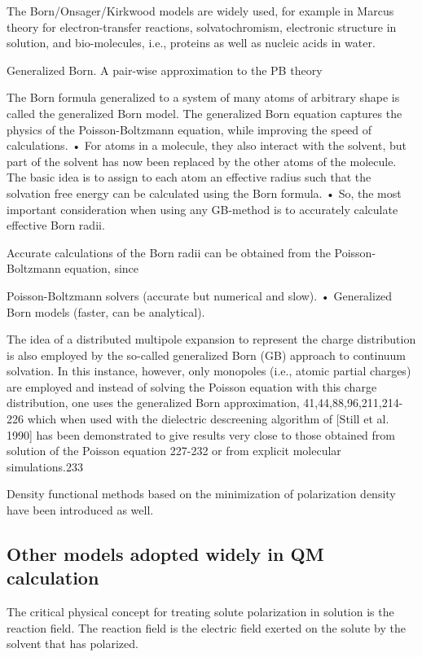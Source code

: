 The Born/Onsager/Kirkwood models are widely used, for example in Marcus
theory for electron-transfer reactions, solvatochromism, electronic
structure in solution, and bio-molecules, i.e., proteins as well as nucleic
acids in water. \citep{hirata_molecular_2004}

Generalized Born. A pair-wise approximation to the PB theory

The Born formula generalized to a system of many atoms of arbitrary
shape is called the generalized Born model. The generalized Born equation
captures the physics of the Poisson-Boltzmann equation, while improving
the speed of calculations. • For atoms in a molecule, they also interact
with the solvent, but part of the solvent has now been replaced by
the other atoms of the molecule. The basic idea is to assign to each
atom an effective radius such that the solvation free energy can
be calculated using the Born formula. • So, the most important consideration
when using any GB-method is to accurately calculate effective Born
radii.

Accurate calculations of the Born radii can be obtained from the
Poisson-Boltzmann equation, since

Poisson-Boltzmann solvers (accurate but numerical and slow). • Generalized
Born models (faster, can be analytical). 

The idea of a distributed multipole expansion to represent the charge
distribution is also employed by the so-called generalized Born (GB)
approach to continuum solvation. In this instance, however, only monopoles
(i.e., atomic partial charges) are employed and instead of solving
the Poisson equation with this charge distribution, one uses the generalized
Born approximation, 41,44,88,96,211,214-226 which when used with
the dielectric descreening algorithm of {[}Still et al. 1990{]} has
been demonstrated to give results very close to those obtained from
solution of the Poisson equation 227-232 or from explicit molecular
simulations.233 

Density functional methods based on the minimization of polarization
density have been introduced as well. \citep{Marchi_2001}


\subsection{Other models adopted widely in QM calculation}

The critical physical concept for treating solute polarization in
solution is the reaction field. The reaction field is the electric
field exerted on the solute by the solvent that has polarized.

